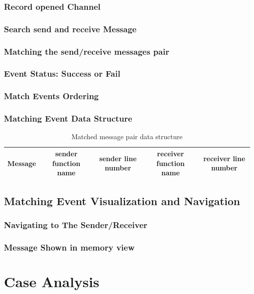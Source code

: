 \documentclass[paper=a4, fontsize=11pt]{scrartcl}
\numberwithin{equation}{section}		%
\numberwithin{figure}{section}			%
\numberwithin{table}{section}				%
\begin{document}
\subsubsection{Record opened Channel}
\subsubsection{Search send and receive Message}
\subsubsection{Matching the send/receive messages pair}
\subsubsection{Event Status: Success or Fail}
\subsubsection{Match Events Ordering}
\subsubsection{Matching Event Data Structure}
\begin{table}[h]
 \begin{center}
  \caption{Matched message pair data structure}
\label{table2}
\begin{tabular}{|c|c|c|c|c|}
      \hline
         Message& sender function name & sender line number  & receiver function name & receiver line number \\
       \hline
\end{tabular}
\end{center}
\end{table}
\subsection{Matching Event Visualization and Navigation}
\subsubsection{Navigating to The Sender/Receiver}
\subsubsection{Message Shown in memory view}



\section{Case Analysis}
\end{document}
